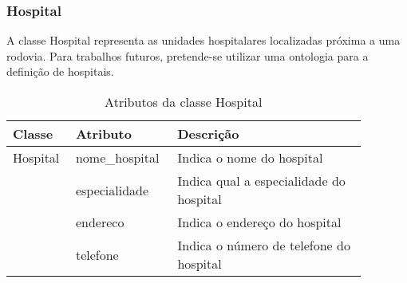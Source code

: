 \subsubsection{\textbf{Hospital}}

  A classe Hospital representa as unidades hospitalares localizadas próxima a uma rodovia. Para trabalhos futuros, pretende-se
  utilizar uma ontologia para a definição de hospitais.
  
    \begin{table*}[!h]
    \centering
    \begin{tabular}{p{0.15\linewidth}p{0.23\linewidth}p{0.5\linewidth}}
      \hline
      \textbf{Classe} & \textbf{Atributo} & \textbf{Descrição}\\
      \hline
	Hospital & nome\_hospital & Indica o nome do hospital\\
		 & especialidade & Indica qual a especialidade do hospital\\
		 & endereco & Indica o endereço do hospital\\
		 & telefone & Indica o número de telefone do hospital\\
      \hline
    \end{tabular}
    \caption{Atributos da classe Hospital}
    \label{tab:attr_hospital}
    \end{table*}
    
\vfill